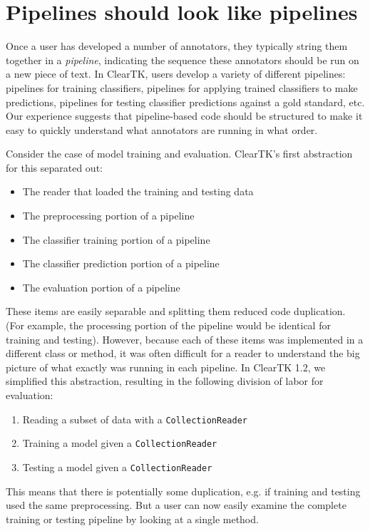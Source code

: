 \documentclass[10pt, a4paper]{article}
\newcommand{\code}[1]{\texttt{\small #1}}
\begin{document}

\section{Pipelines should look like pipelines}
Once a user has developed a number of annotators, they typically string them together in a \emph{pipeline}, indicating the sequence these annotators should be run on a new piece of text.
In ClearTK, users develop a variety of different pipelines: pipelines for training classifiers, pipelines for applying trained classifiers to make predictions, pipelines for testing classifier predictions against a gold standard, etc.
Our experience suggests that pipeline-based code should be structured to make it easy to quickly understand what annotators are running in what order.

Consider the case of model training and evaluation.
ClearTK's first abstraction for this separated out:
\begin{itemize}
\item The reader that loaded the training and testing data
\item The preprocessing portion of a pipeline
\item The classifier training portion of a pipeline
\item The classifier prediction portion of a pipeline
\item The evaluation portion of a pipeline
\end{itemize}
These items are easily separable and splitting them reduced code duplication. (For example, the processing portion of the pipeline would be identical for training and testing).
However, because each of these items was implemented in a different class or method, it was often difficult for a reader to understand the big picture of what exactly was running in each pipeline.
In ClearTK 1.2, we simplified this abstraction, resulting in the following division of labor for evaluation:
\begin{enumerate}
\item Reading a subset of data with a \code{CollectionReader}
\item Training a model given a \code{CollectionReader}
\item Testing a model given a \code{CollectionReader}
\end{enumerate}
This means that there is potentially some duplication, e.g. if training and testing used the same preprocessing.
But a user can now easily examine the complete training or testing pipeline by looking at a single method.
\end{document}
